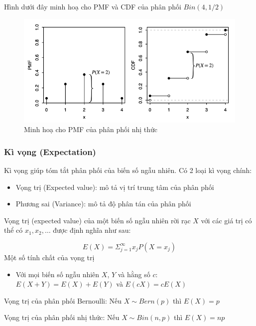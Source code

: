 \documentclass[
]{book}
\providecommand{\tightlist}{%
  \setlength{\itemsep}{0pt}\setlength{\parskip}{0pt}}
\begin{document}
Hình dưới đây minh hoạ cho PMF và CDF của phân phối \(Bin(4, 1/2)\)

\begin{figure}
\includegraphics[width=10.19in]{figures/Picture10} \caption{Minh hoạ cho PMF của phân phối nhị thức}\label{fig:unnamed-chunk-6}
\end{figure}

\hypertarget{kuxec-vux1ecdng-expectation}{%
\subsubsection{Kì vọng (Expectation)}\label{kuxec-vux1ecdng-expectation}}

Kì vọng giúp tóm tắt phân phối của biến số ngẫu nhiên. Có 2 loại kì vọng chính:

\begin{itemize}
\tightlist
\item
  Vọng trị (Expected value): mô tả vị trí trung tâm của phân phối
\item
  Phương sai (Variance): mô tả độ phân tán của phân phối
\end{itemize}

Vọng trị (expected value) của một biến số ngẫu nhiên rời rạc \(X\) với các giá trị có thể có \(x_1, x_2, \ldots\) được định nghĩa như sau:

\[
E(X) = \Sigma^\infty_{j = 1} x_j P(X = x_j)
\]
Một số tính chất của vọng trị

\begin{itemize}
\tightlist
\item
  Với mọi biến số ngẫu nhiên \(X\), \(Y\) và hằng số \(c\): \(E(X + Y) = E(X) + E(Y)\) và \(E(cX) = c E(X)\)
\end{itemize}

Vọng trị của phân phối Bernoulli: Nếu \(X \sim Bern(p)\) thì \(E(X) = p\)

Vọng trị của phân phối nhị thức: Nếu \(X \sim Bin(n, p)\) thì \(E(X) = np\)
\end{document}
